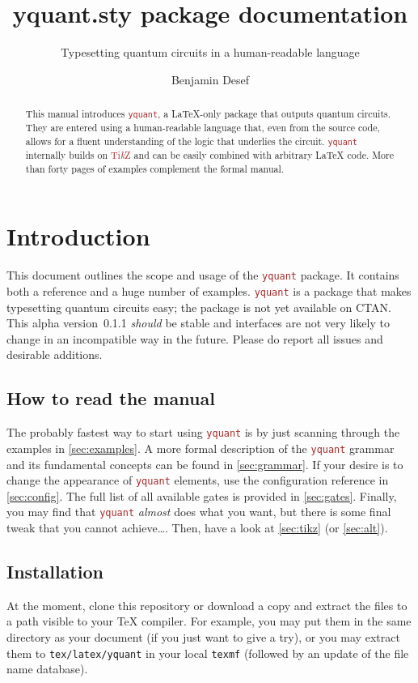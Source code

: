 \documentclass{scrartcl}
\title{yquant.sty package documentation}
\subtitle{Typesetting quantum circuits in a human-readable language}
\author{Benjamin Desef}
\def\TikZ{\textcolor{brown}{Ti\textit kZ}}
\def\pkg#1{\textcolor{brown}{\texttt{#1}}}
\def\Yquant{\pkg{yquant}}
\begin{document}
   \maketitle
   \begin{abstract}
      \noindent This manual introduces \Yquant, a \LaTeX\hyp only package that outputs quantum circuits.
      They are entered using a human\hyp readable language that, even from the source code, allows for a fluent understanding of the logic that underlies the circuit.
      \Yquant{} internally builds on \TikZ{} and can be easily combined with arbitrary \LaTeX{} code.
      More than forty pages of examples complement the formal manual.
   \end{abstract}
   \tableofcontents
   
   \clearpage
   \section{Introduction}
      This document outlines the scope and usage of the \Yquant{} package.
      It contains both a reference and a huge number of examples.
      \Yquant{} is a package that makes typesetting quantum circuits easy; the package is not yet available on CTAN.
      This alpha version~0.1.1 \emph{should} be stable and interfaces are not very likely to change in an incompatible way in the future.
      Please do report all issues and desirable additions.
      
      \subsection{How to read the manual}
         The probably fastest way to start using \Yquant{} is by just scanning through the examples in \cref{sec:examples}.
         A more formal description of the \Yquant{} grammar and its fundamental concepts can be found in \cref{sec:grammar}.
         If your desire is to change the appearance of \Yquant{} elements, use the configuration reference in \cref{sec:config}.
         The full list of all available gates is provided in \cref{sec:gates}.
         Finally, you may find that \Yquant{} \emph{almost} does what you want, but there is some final tweak that you cannot achieve\dots.
         Then, have a look at \cref{sec:tikz} (or \cref{sec:alt}).
      
      \subsection{Installation}
         At the moment, clone this repository or download a copy and extract the files to a path visible to your \TeX{} compiler.
         For example, you may put them in the same directory as your document (if you just want to give a try), or you may extract them to \texttt{tex/latex/yquant} in your local \texttt{texmf} (followed by an update of the file name database).
      
\end{document}
